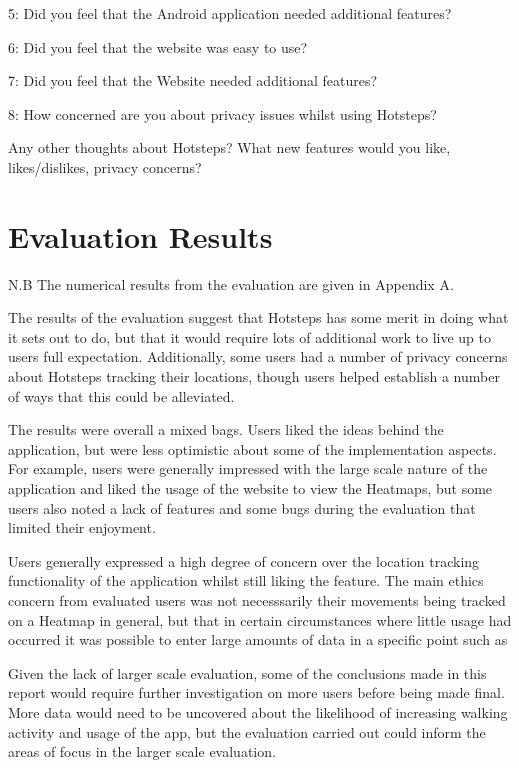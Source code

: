 \documentclass{l4proj}
\begin{document}
5: Did you feel that the Android application needed additional features?

6: Did you feel that the website was easy to use?

7: Did you feel that the Website needed additional features?

8: How concerned are you about privacy issues whilst using Hotsteps?

Any other thoughts about Hotsteps? What new features would you like, likes/dislikes, privacy concerns?

\section{Evaluation Results}

N.B The numerical results from the evaluation are given in Appendix A.

The results of the evaluation suggest that Hotsteps has some merit in doing what it sets out to do, but that it would require lots of additional work to live up to users full expectation. Additionally, some users had a number of privacy concerns about Hotsteps tracking their locations, though users helped establish a number of ways that this could be alleviated.

The results were overall a mixed bags. Users liked the ideas behind the application, but were less optimistic about some of the implementation aspects. For example, users were generally impressed with the large scale nature of the application and liked the usage of the website to view the Heatmaps, but some users also noted a lack of features and some bugs during the evaluation that limited their enjoyment.

Users generally expressed a high degree of concern over the location tracking functionality of the application whilst still liking the feature. The main ethics concern from evaluated users was not necesssarily their movements being tracked on a Heatmap in general, but that in certain circumstances where little usage had occurred it was possible to enter large amounts of data in a specific point such as 

Given the lack of larger scale evaluation, some of the conclusions made in this report would require further investigation on more users before being made final. More data would need to be uncovered about the likelihood of increasing walking activity and usage of the app, but the evaluation carried out could inform the areas of focus in the larger scale evaluation. 
\end{document}
